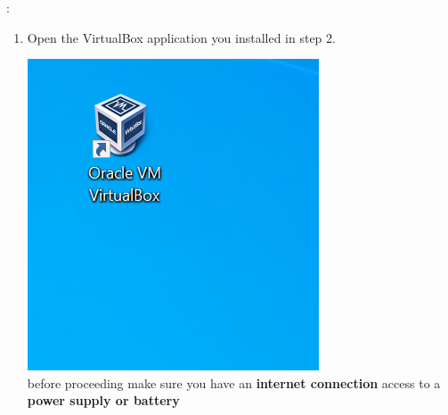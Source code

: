 \documentclass[12pt]{article}
\newcommand{\R}{\color{red}}
\newcommand{\B}{\color{blue}}
\begin{document}
\begin{description}
\begin{description}
\begin{enumerate}[label=\alph*)]
\end{enumerate}
  
  
\newpage  
\item [Part 2 - Virtual Machine Configuration]: \vspace{0mm} \\
\begin{enumerate}[label=\alph*)] 
    	\item Open the VirtualBox application you installed in step 2. \vspace{5mm} \\
    	\begin{multicols}{2}
      	\includegraphics[scale=.55]{Capture2.png}\\
          
                
                before proceeding make sure you have an {\bf \B internet connection } access to a {\bf \R power supply or battery }
         
            \end{multicols}
            \vspace{10mm}
       


\end{enumerate}
\end{description}
\end{description}
\end{document}
